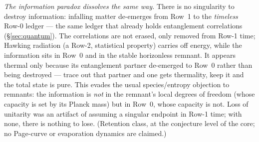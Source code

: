 \documentclass[11pt]{article}
\begin{document}
\emph{The information paradox dissolves the same way.} There is no singularity to destroy information: infalling
matter de-emerges from Row~1 to the \emph{timeless} Row-0 ledger --- the same ledger that already holds
entanglement correlations (\S\ref{sec:quantum}). The correlations are not erased, only removed from Row-1 time; Hawking
radiation (a Row-2, statistical property) carries off energy, while the information sits in Row~0 and in the
stable horizonless remnant. It appears thermal only because its entanglement partner de-emerged to Row~0 rather
than being destroyed --- trace out that partner and one gets thermality, keep it and the total state is pure.
This evades the usual species/entropy objection to remnants: the information is \emph{not} in the remnant's
local degrees of freedom (whose capacity is set by its Planck mass) but in Row~0, whose capacity is not.
Loss of unitarity was an artifact of assuming a singular endpoint in Row-1 time; with none, there is nothing to
lose. (Retention class, at the conjecture level of the core; no Page-curve or evaporation dynamics are claimed.)
\end{document}
